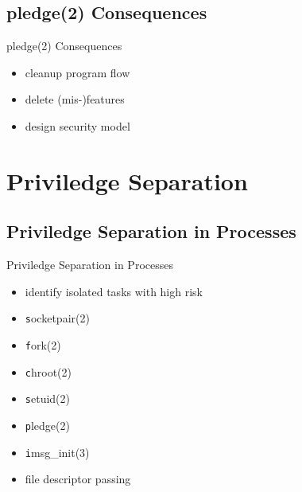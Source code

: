 \documentclass[14pt]{beamer}
\begin{document}
\subsection{pledge(2) Consequences}
\begin{frame}{pledge(2) Consequences}
\begin{itemize}
    \item cleanup program flow
    \item delete (mis-)features
    \item design security model
\end{itemize}
\end{frame}

\section{Priviledge Separation}

\subsection{Priviledge Separation in Processes}
\begin{frame}{Priviledge Separation in Processes}
\begin{itemize}
    \item identify isolated tasks with high risk
    \item {\texttt socketpair(2)}
    \item {\texttt fork(2)}
    \item {\texttt chroot(2)}
    \item {\texttt setuid(2)}
    \item {\texttt pledge(2)}
    \item {\texttt imsg\_init(3)}
    \item file descriptor passing
\end{itemize}
\end{frame}
\end{document}
